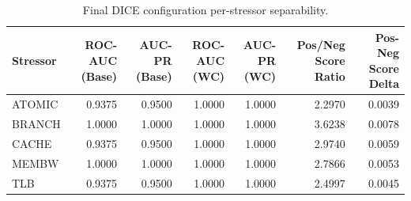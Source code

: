 \begin{table}[t]
\centering
\caption{Final DICE configuration per-stressor separability.}
\label{tab:dice_full_stressor}
\footnotesize
\begin{tabular}{lrrrrrr}
\toprule
Stressor & ROC-AUC (Base) & AUC-PR (Base) & ROC-AUC (WC) & AUC-PR (WC) & Pos/Neg Score Ratio & Pos-Neg Score Delta \\
\midrule
ATOMIC & 0.9375 & 0.9500 & 1.0000 & 1.0000 & 2.2970 & 0.0039 \\
BRANCH & 1.0000 & 1.0000 & 1.0000 & 1.0000 & 3.6238 & 0.0078 \\
CACHE & 0.9375 & 0.9500 & 1.0000 & 1.0000 & 2.9740 & 0.0059 \\
MEMBW & 1.0000 & 1.0000 & 1.0000 & 1.0000 & 2.7866 & 0.0053 \\
TLB & 0.9375 & 0.9500 & 1.0000 & 1.0000 & 2.4997 & 0.0045 \\
\bottomrule
\end{tabular}

\end{table}
